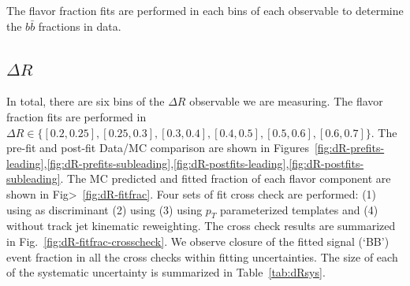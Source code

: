 \label{sec:gbb-data_mc_comp}

The flavor fraction fits are performed in each bins of each observable to determine the $b\bar b $ fractions in data. 

\subsection{$\Delta R$}

In total, there are six bins of the $\Delta R$ observable we are measuring. The flavor fraction fits are performed in $\Delta R \in\{[0.2, 0.25], [0.25, 0.3], [0.3, 0.4], [0.4,0.5], [0.5,0.6], [0.6,0.7]\}$. The pre-fit and post-fit Data/MC comparison are shown in Figures~\ref{fig:dR-prefits-leading},\ref{fig:dR-prefits-subleading},\ref{fig:dR-postfits-leading},\ref{fig:dR-postfits-subleading}. The MC predicted and fitted fraction of each flavor component are shown in Fig>~\ref{fig:dR-fitfrac}. Four sets of fit cross check are performed: (1) using \sdzero as discriminant (2) using \subsubsdzero (3) using $p_T$ parameterized templates and (4) without track jet kinematic reweighting. The cross check results are summarized in Fig.~\ref{fig:dR-fitfrac-crosscheck}. We observe closure of the fitted signal (`BB') event fraction in all the cross checks within fitting uncertainties. The size of each of the systematic uncertainty is summarized in Table~\ref{tab:dRsys}.

